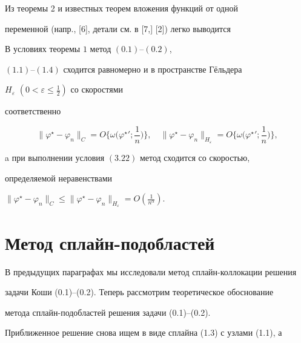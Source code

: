Из теоремы 2 и известных теорем вложения функций от одной 


переменной (напр., [6], детали см. в [7,] [2]) легко выводится





\begin{thm}


В условиях теоремы $1$ метод $(0.1)$--$(0.2)$, 


$(1.1)$--$(1.4)$ сходится равномерно и в пространстве Г\"ельдера


$H_{\varepsilon}$ $(0<\varepsilon\leq\frac{1}{2})$ со скоростями 


соответственно 


$$


\|\varphi^{\star}-\varphi_n\|_C=O\bigg\{\omega\bigg(\varphi^{\star}{}';


\frac{1}{n}\bigg)\bigg\}, \quad


\|\varphi^{\star}-\varphi_n\|_{H_{\varepsilon}}=O\bigg\{\omega\bigg


(\varphi^{\star}{}';\frac{1}{n}\bigg)\bigg\},


$$


a при выполнении условия $(3.22)$ метод сходится со скоростью, 


определяемой неравенствами


$\|\varphi^{\star}-\varphi_n\|_C\leq\|\varphi^{\star}-\varphi_n


\|_{H_{\varepsilon}}=O\left(\frac{1}{n^{\alpha}}\right)$. 


\end{thm}





\section{Метод сплайн-подобластей} 





В предыдущих параграфах мы исследовали метод сплайн-коллокации решения


задачи Коши (0.1)--(0.2). Теперь рассмотрим теоретическое обоснование 


метода сплайн-подобластей решения задачи (0.1)--(0.2). 





Приближенное решение снова ищем в виде сплайна (1.3) с узлами (1.1), а


